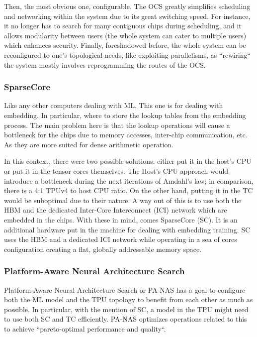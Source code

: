 Then, the most obvious one, configurable.
The OCS greatly simplifies scheduling and networking within the system due to its great switching speed.
For instance, it no longer has to search for many contiguous chips during scheduling, and it allows modularity between users (the whole system can cater to multiple users) which enhances security.
Finally, foreshadowed before, the whole system can be reconfigured to one's topological needs, like exploiting parallelisms, as ``rewiring`` the system mostly involves reprogramming the routes of the OCS\@.

\subsubsection{SparseCore}
Like any other computers dealing with ML, This one is for dealing with embedding.
In particular, where to store the lookup tables from the embedding process.
The main problem here is that the lookup operations will cause a bottleneck for the chips due to memory accesses, inter-chip communication, etc.
As they are more suited for dense arithmetic operation.

In this context, there were two possible solutions: either put it in the host’s CPU or put it in the tensor cores themselves.
The Host’s CPU approach would introduce a bottleneck during the next iterations of Amdahl’s law; in comparison, there is a 4:1 TPUv4 to host CPU ratio.
On the other hand, putting it in the TC would be suboptimal due to their nature.
A way out of this is to use both the HBM and the dedicated Inter-Core Interconnect (ICI) network which are embedded in the chips.
With these in mind, comes SparseCore (SC).
It is an additional hardware put in the machine for dealing with embedding training.
SC uses the HBM and a dedicated ICI network while operating in a sea of cores configuration creating a flat, globally addressable memory space.

\subsubsection{Platform-Aware Neural Architecture Search}
Platform-Aware Neural Architecture Search or PA-NAS has a goal to configure both the ML model and the TPU topology to benefit from each other as much as possible.
In particular, with the mention of SC, a model in the TPU might need to use both SC and TC efficiently.
PA-NAS optimizes operations related to this to achieve ``pareto-optimal performance and quality``.